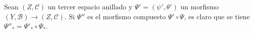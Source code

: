 \begin{env}[4.2.6]
\label{0.4.2.6-fr}
Sean $(Z,\mathcal{C})$ un tercer espacio anillado y
$\Psi'=(\psi',\theta')$ un morfismo
$(Y,\mathcal{B})\to(Z,\mathcal{C})$. Si $\Psi''$ es el morfismo compuesto
$\Psi'\circ\Psi$, es claro que se tiene
$\Psi''_*=\Psi'_*\circ\Psi_*$.
\end{env}
